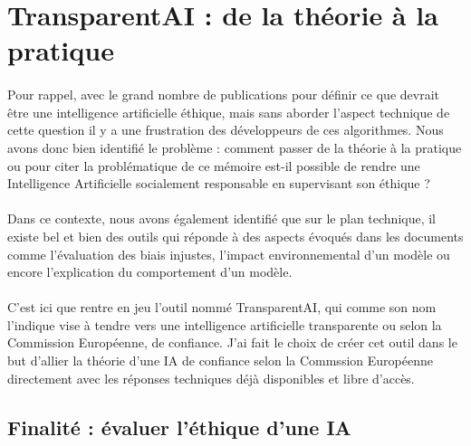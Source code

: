\documentclass[10pt, french, a4paper]{report}
\begin{document}
\section{TransparentAI : de la théorie à la pratique}
\label{sec:transparentai}

\paragraph{}
Pour rappel, avec le grand nombre de publications pour définir ce que devrait être une intelligence artificielle éthique, mais sans aborder l'aspect technique de cette question il y a une frustration des développeurs de ces algorithmes. Nous avons donc bien identifié le problème : comment passer de la théorie à la pratique ou pour citer la problématique de ce mémoire est-il possible de rendre une Intelligence Artificielle socialement responsable en supervisant son éthique ?

\paragraph{}
Dans ce contexte, nous avons également identifié que sur le plan technique, il existe bel et bien des outils qui réponde à des aspects évoqués dans les documents comme l'évaluation des biais injustes, l'impact environnemental d'un modèle ou encore l'explication du comportement d'un modèle.

\paragraph{}
C'est ici que rentre en jeu l'outil nommé TransparentAI, qui comme son nom l'indique vise à tendre vers une intelligence artificielle transparente ou selon la Commission Européenne, de confiance. J'ai fait le choix de créer cet outil dans le but d'allier la théorie d'une IA de confiance selon la Commssion Européenne directement avec les réponses techniques déjà disponibles et libre d'accès. 

\subsection{Finalité : évaluer l'éthique d'une IA}
\end{document}
